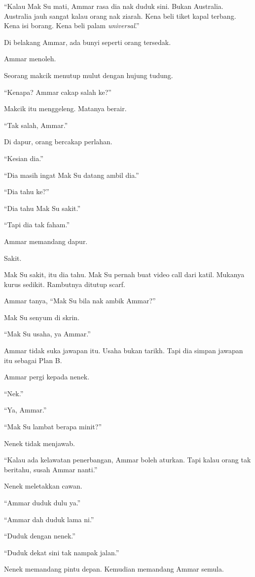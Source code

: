 \documentclass[
  11pt,
  a5paper,
  openany,
  oneside]{book}
\begin{document}
``Kalau Mak Su mati, Ammar rasa dia nak duduk sini. Bukan Australia.
Australia jauh sangat kalau orang nak ziarah. Kena beli tiket kapal
terbang. Kena isi borang. Kena beli palam \emph{universal}.''

Di belakang Ammar, ada bunyi seperti orang tersedak.

Ammar menoleh.

Seorang makcik menutup mulut dengan hujung tudung.

``Kenapa? Ammar cakap salah ke?''

Makcik itu menggeleng. Matanya berair.

``Tak salah, Ammar.''

Di dapur, orang bercakap perlahan.

``Kesian dia.''

``Dia masih ingat Mak Su datang ambil dia.''

``Dia tahu ke?''

``Dia tahu Mak Su sakit.''

``Tapi dia tak faham.''

Ammar memandang dapur.

Sakit.

Mak Su sakit, itu dia tahu. Mak Su pernah buat video call dari katil.
Mukanya kurus sedikit. Rambutnya ditutup scarf.

Ammar tanya, ``Mak Su bila nak ambik Ammar?''

Mak Su senyum di skrin.

``Mak Su usaha, ya Ammar.''

Ammar tidak suka jawapan itu. Usaha bukan tarikh. Tapi dia simpan
jawapan itu sebagai Plan B.

Ammar pergi kepada nenek.

``Nek.''

``Ya, Ammar.''

``Mak Su lambat berapa minit?''

Nenek tidak menjawab.

``Kalau ada kelawatan penerbangan, Ammar boleh aturkan. Tapi kalau orang
tak beritahu, susah Ammar nanti.''

Nenek meletakkan cawan.

``Ammar duduk dulu ya.''

``Ammar dah duduk lama ni.''

``Duduk dengan nenek.''

``Duduk dekat sini tak nampak jalan.''

Nenek memandang pintu depan. Kemudian memandang Ammar semula.
\end{document}
